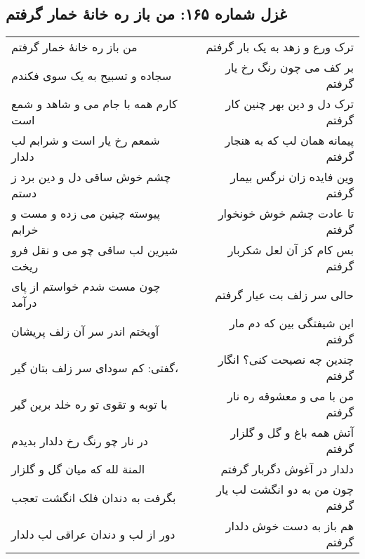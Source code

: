 \begin{center}
\section*{غزل شماره ۱۶۵: من باز ره خانهٔ خمار گرفتم}
\label{sec:165}
\begin{longtable}{l p{0.5cm} r}
من باز ره خانهٔ خمار گرفتم
&&
ترک ورع و زهد به یک بار گرفتم
\\
سجاده و تسبیح به یک سوی فکندم
&&
بر کف می چون رنگ رخ یار گرفتم
\\
کارم همه با جام می و شاهد و شمع است
&&
ترک دل و دین بهر چنین کار گرفتم
\\
شمعم رخ یار است و شرابم لب دلدار
&&
پیمانه همان لب که به هنجار گرفتم
\\
چشم خوش ساقی دل و دین برد ز دستم
&&
وین فایده زان نرگس بیمار گرفتم
\\
پیوسته چینین می زده و مست و خرابم
&&
تا عادت چشم خوش خونخوار گرفتم
\\
شیرین لب ساقی چو می و نقل فرو ریخت
&&
بس کام کز آن لعل شکربار گرفتم
\\
چون مست شدم خواستم از پای درآمد
&&
حالی سر زلف بت عیار گرفتم
\\
آویختم اندر سر آن زلف پریشان
&&
این شیفتگی بین که دم مار گرفتم
\\
گفتی: کم سودای سر زلف بتان گیر،
&&
چندین چه نصیحت کنی؟ انگار گرفتم
\\
با توبه و تقوی تو ره خلد برین گیر
&&
من با می و معشوقه ره نار گرفتم
\\
در نار چو رنگ رخ دلدار بدیدم
&&
آتش همه باغ و گل و گلزار گرفتم
\\
المنة لله که میان گل و گلزار
&&
دلدار در آغوش دگربار گرفتم
\\
بگرفت به دندان فلک انگشت تعجب
&&
چون من به دو انگشت لب یار گرفتم
\\
دور از لب و دندان عراقی لب دلدار
&&
هم باز به دست خوش دلدار گرفتم
\\
\end{longtable}
\end{center}
